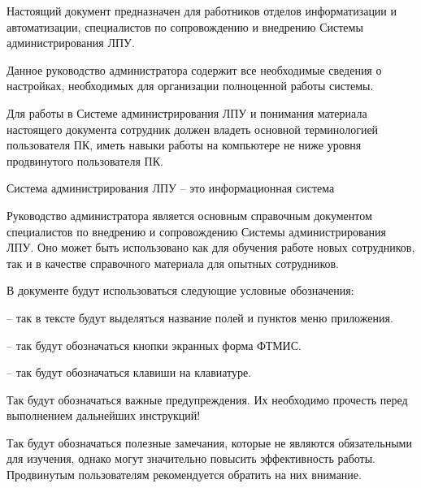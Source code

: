 \newpage
{}

Настоящий документ предназначен для работников отделов информатизации и автоматизации, специалистов по сопровождению и внедрению Системы администрирования ЛПУ.

Данное руководство администратора содержит все необходимые сведения о настройках, необходимых для организации полноценной работы системы.

Для работы в Системе администрирования ЛПУ и понимания материала настоящего документа сотрудник должен владеть основной терминологией пользователя ПК, иметь навыки работы на компьютере не ниже уровня продвинутого пользователя ПК.

Система администрирования ЛПУ – это информационная система 

\newpage
{}

Руководство администратора является основным справочным документом специалистов по внедрению и сопровождению Системы администрирования ЛПУ. Оно может быть использовано как для обучения работе новых сотрудников, так и в качестве справочного материала для опытных сотрудников.

В документе будут использоваться следующие условные обозначения: \vspace*{0.5em}
 
  -- так в тексте будут выделяться название полей и пунктов меню приложения.
 
  -- так будут обозначаться кнопки экранных форма ФТМИС.
 
  -- так будут обозначаться клавиши на клавиатуре.
 
 \begin{vnim}
  Так будут обозначаться важные предупреждения. Их необходимо прочесть перед выполнением дальнейших инструкций!
 \end{vnim}
 
 \begin{prim}
 Так будут обозначаться полезные замечания, которые не являются обязательными для изучения, однако могут значительно повысить эффективность работы. Продвинутым пользователям рекомендуется обратить на них внимание.
 \end{prim}

